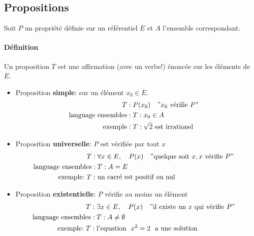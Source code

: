 \documentclass[
    11pt,
    a4paper,
    oneside,
    headinlcude, footinclude,
    twoside,
]{report}
\begin{document}
\subsection{Propositions}
\label{sub:propositions}

Soit $P$ un propriété définie sur un référentiel $E$ et $A$ l'ensemble
correspondant.

\paragraph{Définition}
\label{par:definition}

Un proposition $T$ est une affirmation (avec un verbe!) énoncée sur les
éléments de $E$.

\begin{itemize}
    \item Proposition \textbf{simple}: sur un élément $x_{0} \in E$.
        \[
        \begin{split}
            T &: P(x_{0}) \quad "x_{0} \ \textrm{vérifie}\ P"\\
            \textrm{language ensembles}  &: T: x_{0} \in A\\
            \textrm{exemple}&: T : \sqrt{2} \ \textrm{est irrationel} 
        \end{split}
        \]

    \item Proposition \textbf{universelle}: $P$ est vérifiée par tout $x$
        \[
        \begin{split}
            T &: \forall x \in E, \quad P(x) \quad "\textrm{quelque soit}\  x, x\ \textrm{vérifie}\ P"\\
            \textrm{language ensembles}  &: T: A = E\\
            \textrm{exemple:}\ T &: \textrm{un carré est positif ou nul} 
        \end{split}
        \]

    \item Proposition \textbf{existentielle}: $P$ vérifie au moins un élément 
        \[
        \begin{split}
            T &: \exists x \in E, \quad P(x) \quad "\textrm{il existe un}\  x \ \textrm{qui vérifie}\ P"\\
            \textrm{language ensembles}  &: T: A \neq \emptyset\\
            \textrm{exemple:}\ T &: \textrm{l'equation }\ x^{2} = 2 \ \textrm{ a
            une solution} 
        \end{split}
        \]
\end{itemize}
\end{document}
